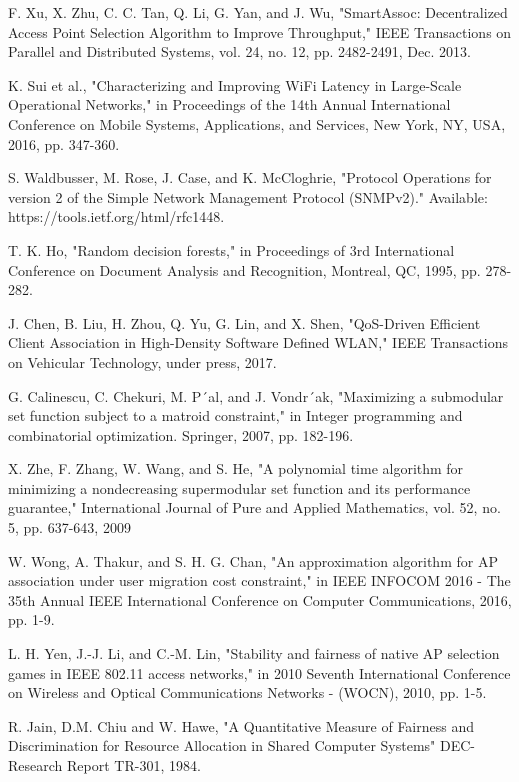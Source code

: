 \begin{thebibliography}{1}
 F. Xu, X. Zhu, C. C. Tan, Q. Li, G. Yan, and J. Wu, "SmartAssoc: Decentralized Access Point Selection Algorithm to Improve Throughput," IEEE Transactions on Parallel and Distributed Systems, vol. 24, no. 12, pp. 2482-2491, Dec. 2013.

 K. Sui et al., "Characterizing and Improving WiFi Latency in Large-Scale Operational Networks," in Proceedings of the 14th Annual International Conference on Mobile Systems, Applications, and Services, New York, NY, USA, 2016, pp. 347-360.

 S. Waldbusser, M. Rose, J. Case, and K. McCloghrie, "Protocol Operations for version 2 of the Simple Network Management Protocol (SNMPv2)." Available: https://tools.ietf.org/html/rfc1448.

 T. K. Ho, "Random decision forests," in Proceedings of 3rd International Conference on Document Analysis and Recognition, Montreal, QC, 1995, pp. 278-282.

 J. Chen, B. Liu, H. Zhou, Q. Yu, G. Lin, and X. Shen, "QoS-Driven Efficient Client Association in High-Density Software Defined WLAN," IEEE Transactions on Vehicular Technology, under press, 2017.

 G. Calinescu, C. Chekuri, M. P´al, and J. Vondr´ak, "Maximizing a submodular set function subject to a matroid constraint," in Integer programming and combinatorial optimization. Springer, 2007, pp. 182-196.

 X. Zhe, F. Zhang, W. Wang, and S. He, "A polynomial time algorithm for minimizing a nondecreasing supermodular set function and its performance guarantee," International Journal of Pure and Applied Mathematics, vol. 52, no. 5, pp. 637-643, 2009


 W. Wong, A. Thakur, and S. H. G. Chan, "An approximation algorithm for AP association under user migration cost constraint," in IEEE INFOCOM 2016 - The 35th Annual IEEE International Conference on Computer Communications, 2016, pp. 1-9.

 L. H. Yen, J.-J. Li, and C.-M. Lin, "Stability and fairness of native AP selection games in IEEE 802.11 access networks," in 2010 Seventh International Conference on Wireless and Optical Communications Networks - (WOCN), 2010, pp. 1-5.

  R. Jain,  D.M. Chiu and W. Hawe, "A Quantitative Measure of Fairness and Discrimination for Resource Allocation in Shared Computer Systems" DEC-Research Report TR-301, 1984.


\end{thebibliography}
